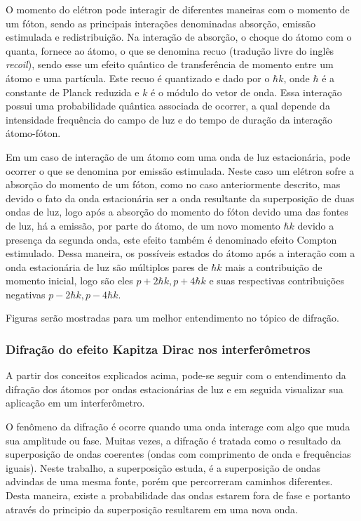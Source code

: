 		\par O momento do elétron pode interagir de diferentes maneiras com o momento de um fóton, sendo as principais interações denominadas absorção, emissão estimulada e redistribuição. Na  interação de absorção, o choque do átomo com o quanta, fornece ao átomo, o que se denomina recuo (tradução livre do inglês \textit{recoil}), sendo esse um efeito quântico de transferência de momento entre um átomo e uma partícula. Este recuo é quantizado e dado por o  $\hbar k$, onde $\hbar$ é a constante de Planck reduzida e $k$ é o módulo do vetor de onda\cite{ricardo_2}. Essa interação possui uma probabilidade  quântica associada de ocorrer, a qual depende da intensidade frequência do campo de luz e do tempo de duração da interação átomo-fóton\cite{ricardo_2}.
		
		\par Em um caso de interação de um átomo com uma onda de luz estacionária, pode ocorrer o que se denomina por emissão estimulada\cite{ricardo_2}\cite{ricardo_4}. Neste caso um elétron sofre a absorção do momento de um fóton, como no caso anteriormente descrito, mas devido o fato da onda estacionária ser a onda resultante da superposição de duas ondas de luz, logo após a absorção do momento do fóton devido uma das fontes de luz, há a emissão, por parte do átomo, de um novo momento $\hbar k$ devido a presença da segunda onda\cite{ricardo_4}, este efeito também é denominado efeito Compton estimulado. Dessa maneira, os possíveis estados do átomo após a interação com a onda estacionária de luz são múltiplos pares de $\hbar k$ mais a contribuição de momento inicial, logo são eles $p + 2\hbar k, p + 4\hbar k$ e suas respectivas contribuições negativas $p - 2\hbar k, p - 4\hbar k$\cite{ricardo_2}.
		
		\par Figuras serão mostradas para um melhor entendimento no tópico de difração.

		\subsubsection{Difração do efeito Kapitza Dirac nos interferômetros}

			\par A partir dos conceitos explicados acima, pode-se seguir com o entendimento da difração dos átomos por ondas estacionárias de luz e em seguida visualizar sua aplicação em um interferômetro.
			
			\par O fenômeno da difração é ocorre quando uma onda interage com algo que muda sua amplitude ou fase. Muitas vezes, a difração é tratada como o resultado da superposição de ondas coerentes (ondas com comprimento de onda e frequências iguais)\cite{ricardo_5}. Neste trabalho, a superposição estuda, é a superposição de ondas advindas de uma mesma fonte, porém que percorreram caminhos diferentes. Desta maneira, existe a probabilidade das ondas estarem fora de fase e portanto através do principio da superposição resultarem em uma nova onda.
			
